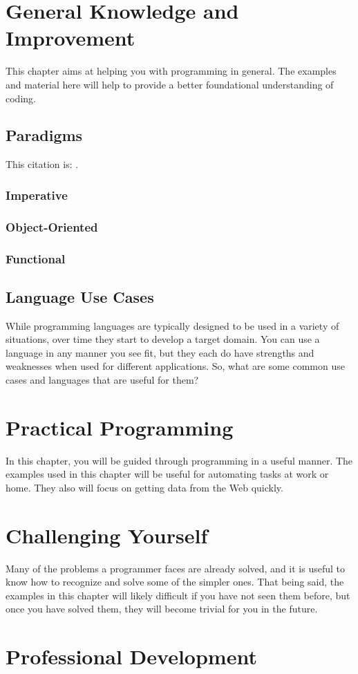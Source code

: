 \documentclass[12pt, oneside, a4paper]{book}
\begin{document}
   \chapter{General Knowledge and Improvement}
   \label{chap:general}
      This chapter aims at helping you with programming in general.
      The examples and material here will help to provide a better foundational understanding of coding.

      \section{Paradigms}
      This citation is: \cite{RefWorks:doc:60ae896f8f088588c91881d6}.
      \subsection{Imperative}
      \subsection{Object-Oriented}
      \subsection{Functional}
      \section{Language Use Cases}
         While programming languages are typically designed to be used in a variety of situations, over time they start to develop a target domain.
         You can use a language in any manner you see fit, but they each do have strengths and weaknesses when used for different applications.
         So, what are some common use cases and languages that are useful for them?

   \chapter{Practical Programming}
   \label{chap:practical}
      In this chapter, you will be guided through programming in a useful manner.
      The examples used in this chapter will be useful for automating tasks at work or home.
      They also will focus on getting data from the Web quickly.
   \chapter{Challenging Yourself}
      Many of the problems a programmer faces are already solved, and it is useful to know how to recognize and solve some of the simpler ones.
      That being said, the examples in this chapter will likely difficult if you have not seen them before, but once you have solved them, they will become trivial for you in the future.
   \label{chap:challenge}
   \chapter{Professional Development}
   \label{chap:prof_devel}


\end{document}
